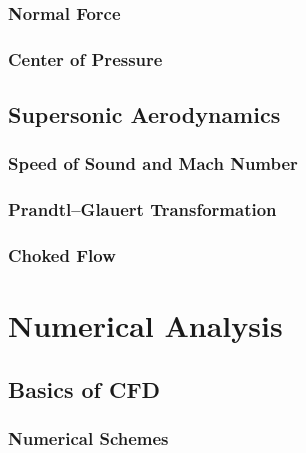 \documentclass[uplatex,dvipdfmx,a4j,11pt]{report}
\numberwithin{equation}{chapter}
\begin{document}
\subsection{Normal Force}
\subsection{Center of Pressure}

\section{Supersonic Aerodynamics}
\subsection{Speed of Sound and Mach Number}

\subsection{Prandtl--Glauert Transformation}

\subsection{Choked Flow}


\chapter{Numerical Analysis}

\section{Basics of CFD}
\subsection{Numerical Schemes}
\end{document}
